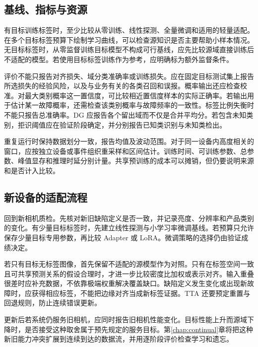 \subsection{基线、指标与资源}
有目标训练标签时，至少比较从零训练、线性探测、全量微调和适用的轻量适配。在多个目标标签预算下绘制学习曲线，可以检查源知识是否主要帮助小样本情况。无目标标签时，从零监督训练目标模型不构成可行基线，应先比较源域直接训练后不适配的模型。若使用目标标签训练作为参考，应明确标为额外监督条件。

评价不能只报告对齐损失、域分类准确率或训练损失。应在固定目标测试集上报告所选损失的经验风险，以及与业务有关的各类召回和误报。概率输出还应检查校准。对最大类别概率这一置信度，可比较相近置信度样本的实际正确率。若输出用于估计某一故障概率，还需检查该类别概率与故障频率的一致性。标签比例失衡时不能只报告总准确率。DG 应报告各个留出域而不仅是合并平均分。若包含未知类别，拒识阈值应在验证阶段确定，并分别报告已知类识别与未知类检出。

重复运行时保持数据划分一致，报告均值及波动范围。对于同一设备内高度相关的窗口，应按独立设备或事件组织重采样和区间估计。训练时间、可训练参数、总参数、峰值显存和推理时延分别计量。共享预训练的成本可以摊销，但仍要说明来源和是否计入比较。

\subsection{新设备的适配流程}
回到新相机质检。先核对新旧缺陷定义是否一致，并记录亮度、分辨率和产品类别的变化。有少量目标标签时，先建立线性探测与小学习率微调基线。若预算只允许保存少量目标专用参数，再比较 Adapter 或 LoRA。微调策略的选择仍由验证成绩决定。

若只有目标无标签图像，首先保留不适配的源模型作为对照。只有在标签空间一致且可共享预测关系的假设合理时，才进一步比较密度比加权或表示对齐。输入重叠很差时应补充数据，不依靠极端权重解决覆盖缺口。缺陷定义发生变化或出现新故障时，应获得相应标签，不能把边缘对齐当成新标签证据。TTA 还要预定重置与回退规则，防止连续错误更新。

更新后若系统仍服务旧相机，应同时报告旧相机性能变化。目标性能上升而源域下降时，是否接受这种取舍属于预先规定的服务目标。第\ref{chap:continual}章将把这种新旧能力冲突扩展到连续到达的数据流，并用逐阶段评价检查学习和遗忘。

